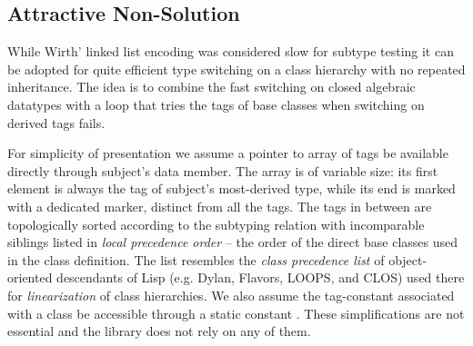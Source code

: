 \subsection{Attractive Non-Solution}
\label{sec:cotc}



While Wirth' linked list encoding was considered slow for subtype testing it can 
be adopted for quite efficient type switching on a class hierarchy with no 
repeated inheritance. The idea is to combine the fast switching on closed 
algebraic datatypes with a loop that tries the tags of base classes when 
switching on derived tags fails.


For simplicity of presentation we assume a pointer to array of tags be available 
directly through subject's  data member. The array is of 
variable size: its first element is always the tag of subject's most-derived 
type, while its end is marked with a dedicated  marker, 
distinct from all the tags. The tags in between are topologically sorted 
according to the subtyping relation with incomparable siblings listed in 
\emph{local precedence order} -- the order of the direct base classes used in 
the class definition. The list resembles the \emph{class precedence list} of 
object-oriented descendants of Lisp (e.g. Dylan, Flavors, LOOPS, and CLOS) used 
there for \emph{linearization} of class hierarchies. 
We also assume the tag-constant associated with a class  be accessible 
through a static constant . These simplifications are not 
essential and the library does not rely on any of them.


